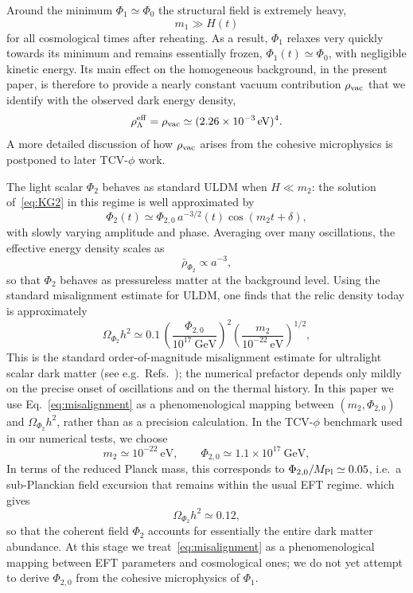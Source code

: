 \documentclass[aps,prd,onecolumn,nofootinbib,superscriptaddress]{revtex4-2}
\newcommand{\Mpl}{M_{\rm Pl}}
\begin{document}
Around the minimum $\Phi_1\simeq \Phi_0$ the structural field is extremely heavy,
\begin{equation}
  m_1 \gg H(t)
\end{equation}
for all cosmological times after reheating.
As a result, $\Phi_1$ relaxes very quickly towards its minimum and remains essentially frozen, $\Phi_1(t)\simeq \Phi_0$, with negligible kinetic energy.
Its main effect on the homogeneous background, in the present paper, is therefore to provide a nearly constant vacuum contribution $\rho_{\rm vac}$ that we identify with the observed dark energy density,
\begin{equation}
  \rho_\Lambda^{\rm eff} = \rho_{\rm vac} 
  \simeq (2.26\times 10^{-3}\,\mathrm{eV})^4.
\end{equation}
A more detailed discussion of how $\rho_{\rm vac}$ arises from the cohesive microphysics is postponed to later TCV-$\phi$ work.

The light scalar $\Phi_2$ behaves as standard ULDM when $H\ll m_2$:
the solution of~\eqref{eq:KG2} in this regime is well approximated by
\begin{equation}
  \Phi_2(t) \simeq \Phi_{2,0}\,a^{-3/2}(t)\cos(m_2 t+\delta),
\end{equation}
with slowly varying amplitude and phase.
Averaging over many oscillations, the effective energy density scales as
\begin{equation}
  \bar\rho_{\Phi_2} \propto a^{-3},
\end{equation}
so that $\Phi_2$ behaves as pressureless matter at the background level.
Using the standard misalignment estimate for ULDM, one finds that the relic density today is approximately
\begin{equation}
  \Omega_{\Phi_2} h^2
  \simeq 0.1\,
  \left(\frac{\Phi_{2,0}}{10^{17}~\mathrm{GeV}}\right)^2
  \left(\frac{m_2}{10^{-22}~\mathrm{eV}}\right)^{1/2},
  \label{eq:misalignment}
\end{equation}
This is the standard order-of-magnitude misalignment estimate for ultralight scalar dark matter (see e.g.\ Refs.~\cite{ULDM,Hui2017,Marsh2016}); the numerical prefactor depends only mildly on the precise onset of oscillations and on the thermal history. In this paper we use Eq.~\eqref{eq:misalignment} as a phenomenological mapping between $(m_2,\Phi_{2,0})$ and $\Omega_{\Phi_2} h^2$, rather than as a precision calculation.
In the TCV-$\phi$ benchmark used in our numerical tests, we choose
\begin{equation}
  m_2 \simeq 10^{-22}~\mathrm{eV},\qquad
  \Phi_{2,0} \simeq 1.1\times 10^{17}~\mathrm{GeV},
\end{equation}
In terms of the reduced Planck mass, this corresponds to $\Phi_{2,0} / \Mpl \simeq 0.05$, i.e.\ a sub-Planckian field excursion that remains within the usual EFT regime.
which gives
\begin{equation}
  \Omega_{\Phi_2} h^2 \simeq 0.12,
\end{equation}
so that the coherent field $\Phi_2$ accounts for essentially the entire dark matter abundance.
At this stage we treat~\eqref{eq:misalignment} as a phenomenological mapping between EFT parameters and cosmological ones; we do not yet attempt to derive $\Phi_{2,0}$ from the cohesive microphysics of $\Phi_1$.
\end{document}
